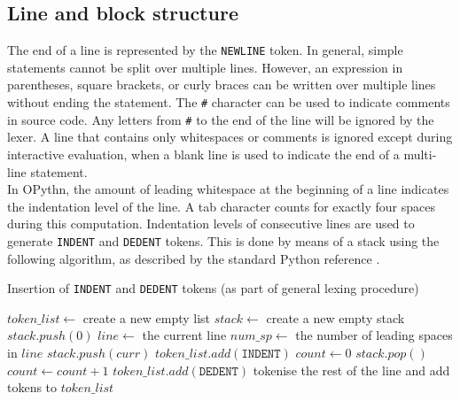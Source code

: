 \documentclass[11pt, twoside]{article}
\newcommand{\ms}{\texttt}
\begin{document}
    \subsection {Line and block structure}
    The end of a line is represented by the \ms{NEWLINE} token. In general, simple statements cannot be split over multiple lines. However, an expression in parentheses, square brackets, or curly braces can be written over multiple lines without ending the statement. The \ms{\#} character can be used to indicate comments in source code. Any letters from \ms{\#} to the end of the line will be ignored by the lexer. A line that contains only whitespaces or comments is ignored except during interactive evaluation, when a blank line is used to indicate the end of a multi-line statement.\\
    \indent In OPythn, the amount of leading whitespace at the beginning of a line indicates the indentation level of the line. A tab character counts for exactly four spaces during this computation. Indentation levels of consecutive lines are used to generate \ms{INDENT} and \ms{DEDENT} tokens. This is done by means of a stack using the following algorithm, as described by the standard Python reference \cite{pythonref}.
    \begin{algorithm}
    \caption{Insertion of \ms{INDENT} and \ms{DEDENT} tokens (as part of general lexing procedure)}
    \begin{algorithmic}[1]
        \State $token\_list \gets$ create a new empty list
        \State $stack \gets$ create a new empty stack
        \State $stack.push(0)$
            \State $line \gets$ the current line
            \State $num\_sp \gets$ the number of leading spaces in $line$
                $stack.push(curr)$
                $token\_list.add(\ms{INDENT})$
                \State $count\gets 0$
                    \State $stack.pop()$
                    \State $count\gets count + 1$
                \EndWhile
                    \State $token\_list.add(\ms{DEDENT})$
                \EndFor
                \EndIf
                \State tokenise the rest of the line and add tokens to $token\_list$
    \end{algorithmic}
    \end{algorithm}
    \begin{algorithm}
    \begin{algorithmic}
        \EndWhile
        \State {}
    \EndProcedure
    \end{algorithmic}
    \end{algorithm}
\end{document}
